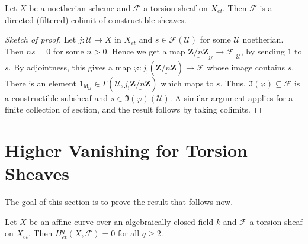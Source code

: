 \begin{lemma} \label{lem:TosionSheavesAreColimitsOfConstructibleOnes}
Let $X$ be a noetherian scheme and $\mathcal{F}$ a torsion sheaf on $X_{et}$. 
Then $\mathcal{F}$ is a directed (filtered) colimit of constructible sheaves.
\end{lemma}

\begin{proof}[Sketch of proof]
Let $j: \mathcal{U} \to X$ in $X_{et}$ and $s\in \mathcal{F}(\mathcal{U})$ for 
some $\mathcal{U}$ noetherian. Then $ns = 0$ for some $n>0$. Hence we get a map 
$\underline{\mathbf{Z}/n\mathbf{Z}}_\mathcal{U}\to \mathcal{F}|_\mathcal{U}$, 
by sending $\bar 1$ to $s$. By adjointness, this gives a map $\varphi: 
j_!(\underline{\mathbf{Z}/n\mathbf{Z}}) \to \mathcal{F}$ whose image contains 
$s$. There is an element $1_{\text{id}_\mathcal{U}} \in \Gamma(\mathcal{U}, 
j_!\underline{\mathbf{Z}/n\mathbf{Z}})$ which maps to $s$. Thus, $\Im(\varphi) 
\subseteq \mathcal{F}$ is a constructible subsheaf and $s\in 
\Im(\varphi)(\mathcal{U})$. A similar argument applies for a finite collection 
of section, and the result follows by taking colimits.
\end{proof}

\section{Higher Vanishing for Torsion Sheaves}
\label{subsection:HigherVanishingForTorsionSheaves}

The goal of this section is to prove the result that follows now.

\begin{theorem} \label{thm:VanishingForAffineCurves}
Let $X$ be an affine curve over an algebraically closed field $k$ and 
$\mathcal{F}$ a torsion sheaf on $X_{et}$. Then $H_{et}^q(X, \mathcal{F}) = 0$ 
for all $q\geq 2$. 
\end{theorem}


